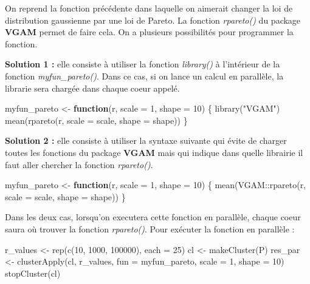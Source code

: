 \documentclass[
]{book}
\newenvironment{Shaded}{\begin{snugshade}}{\end{snugshade}}
\newcommand{\AttributeTok}[1]{\textcolor[rgb]{0.77,0.63,0.00}{#1}}
\newcommand{\ControlFlowTok}[1]{\textcolor[rgb]{0.13,0.29,0.53}{\textbf{#1}}}
\newcommand{\DecValTok}[1]{\textcolor[rgb]{0.00,0.00,0.81}{#1}}
\newcommand{\FunctionTok}[1]{\textcolor[rgb]{0.00,0.00,0.00}{#1}}
\newcommand{\NormalTok}[1]{#1}
\newcommand{\OtherTok}[1]{\textcolor[rgb]{0.56,0.35,0.01}{#1}}
\newcommand{\SpecialCharTok}[1]{\textcolor[rgb]{0.00,0.00,0.00}{#1}}
\newcommand{\StringTok}[1]{\textcolor[rgb]{0.31,0.60,0.02}{#1}}
\theoremstyle{definition}
\theoremstyle{definition}
\theoremstyle{definition}
\theoremstyle{definition}
\theoremstyle{remark}
\begin{document}
On reprend la fonction précédente dans laquelle on aimerait changer la loi de distribution gaussienne par une loi de Pareto. La fonction \emph{rpareto()} du package \textbf{VGAM} permet de faire cela. On a plusieurs possibilités pour programmer la fonction.

\textbf{Solution 1 :} elle consiste à utiliser la fonction \emph{library()} à l'intérieur de la fonction \emph{myfun\_pareto()}. Dans ce cas, si on lance un calcul en parallèle, la librarie sera chargée dans chaque coeur appelé.

\begin{Shaded}
\begin{Highlighting}[]
\NormalTok{myfun\_pareto }\OtherTok{\textless{}{-}} \ControlFlowTok{function}\NormalTok{(r, }\AttributeTok{scale =} \DecValTok{1}\NormalTok{, }\AttributeTok{shape =} \DecValTok{10}\NormalTok{) \{}
  \FunctionTok{library}\NormalTok{(}\StringTok{"VGAM"}\NormalTok{)}
  \FunctionTok{mean}\NormalTok{(}\FunctionTok{rpareto}\NormalTok{(r, }\AttributeTok{scale =}\NormalTok{ scale, }\AttributeTok{shape =}\NormalTok{ shape))}
\NormalTok{\}}
\end{Highlighting}
\end{Shaded}

\textbf{Solution 2 :} elle consiste à utiliser la syntaxe suivante qui évite de charger toutes les fonctions du package \textbf{VGAM} mais qui indique dans quelle librairie il faut aller chercher la fonction \emph{rpareto()}.

\begin{Shaded}
\begin{Highlighting}[]
\NormalTok{myfun\_pareto }\OtherTok{\textless{}{-}} \ControlFlowTok{function}\NormalTok{(r, }\AttributeTok{scale =} \DecValTok{1}\NormalTok{, }\AttributeTok{shape =} \DecValTok{10}\NormalTok{) \{}
  \FunctionTok{mean}\NormalTok{(VGAM}\SpecialCharTok{::}\FunctionTok{rpareto}\NormalTok{(r, }\AttributeTok{scale =}\NormalTok{ scale, }\AttributeTok{shape =}\NormalTok{ shape))}
\NormalTok{\}}
\end{Highlighting}
\end{Shaded}

Dans les deux cas, lorsqu'on executera cette fonction en parallèle, chaque coeur saura où trouver la fonction \emph{rpareto()}. Pour exécuter la fonction en parallèle :

\begin{Shaded}
\begin{Highlighting}[]
\NormalTok{r\_values }\OtherTok{\textless{}{-}} \FunctionTok{rep}\NormalTok{(}\FunctionTok{c}\NormalTok{(}\DecValTok{10}\NormalTok{, }\DecValTok{1000}\NormalTok{, }\DecValTok{100000}\NormalTok{), }\AttributeTok{each =} \DecValTok{25}\NormalTok{)}
\NormalTok{cl }\OtherTok{\textless{}{-}} \FunctionTok{makeCluster}\NormalTok{(P) }
\NormalTok{res\_par }\OtherTok{\textless{}{-}} \FunctionTok{clusterApply}\NormalTok{(cl, r\_values, }\AttributeTok{fun =}\NormalTok{ myfun\_pareto, }
                    \AttributeTok{scale =} \DecValTok{1}\NormalTok{, }\AttributeTok{shape =} \DecValTok{10}\NormalTok{) }
\FunctionTok{stopCluster}\NormalTok{(cl)  }
\end{Highlighting}
\end{Shaded}
\end{document}

